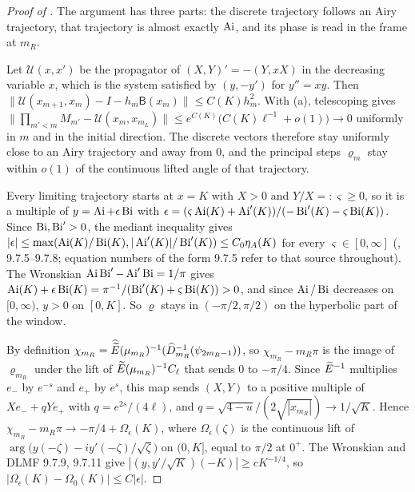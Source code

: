 \begin{proof}[Proof of ]
The argument has three parts: the discrete trajectory follows an Airy trajectory, that
trajectory is almost exactly $\operatorname{Ai}$, and its phase is read in the frame at $m_R$.

 Let $\mathcal U(x,x')$ be the propagator of $(X,Y)'=-(Y,xX)$ in the
decreasing variable $x$, which is the system satisfied by $(y,-y')$ for $y''=xy$. Then
$\|\mathcal U(x_{m+1},x_m)-I-h_m\mathsf B(x_m)\|\le C(K)h_m^2$. With (a),
telescoping gives
$\|\prod_{m'<m}M_{m'}-\mathcal U(x_m,x_{m_L})\|\le e^{C(K)}\bigl(C(K)\ell^{-1}+o(1)\bigr)\to0$
uniformly in $m$ and in the initial direction. The discrete vectors therefore stay
uniformly close to an Airy trajectory and away from $0$, and the principal steps
$\varrho_m$ stay within $o(1)$ of the continuous lifted angle of that trajectory.

 Every limiting trajectory starts at $x=K$ with $X>0$ and
$Y/X=:\varsigma\ge0$, so it is a multiple of $y=\operatorname{Ai}+\epsilon\operatorname{Bi}$ with
$\epsilon=(\varsigma\operatorname{Ai}(K)+\operatorname{Ai}'(K))/(-\operatorname{Bi}'(K)-\varsigma\operatorname{Bi}(K))$. Since $\operatorname{Bi},\operatorname{Bi}'>0$, the mediant
inequality gives $|\epsilon|\le\max(\operatorname{Ai}(K)/\operatorname{Bi}(K),|\operatorname{Ai}'(K)|/\operatorname{Bi}'(K))\le C_0\eta_A(K)$ for
every $\varsigma\in[0,\infty]$ (\cite{DLMF}, 9.7.5--9.7.8; equation numbers of the form 9.7.5
refer to that source throughout). The Wronskian $\operatorname{Ai}\operatorname{Bi}'-\operatorname{Ai}'\operatorname{Bi}=1/\pi$ gives
$\operatorname{Ai}(K)+\epsilon\operatorname{Bi}(K)=\pi^{-1}/(\operatorname{Bi}'(K)+\varsigma\operatorname{Bi}(K))>0$, and since $\operatorname{Ai}/\operatorname{Bi}$ decreases on
$[0,\infty)$, $y>0$ on $[0,K]$. So $\varrho$ stays in $(-\pi/2,\pi/2)$ on the hyperbolic part
of the window.

 By definition $\chi_{m_R}=\widehat{\widetilde E}(\mu_{m_R})^{-1}(\widehat D_{m_R}^{-1}(\psi_{2m_R-1}))$,
so $\chi_{m_R}-m_R\pi$ is the image of $\varrho_{m_R}$ under the lift of $\widetilde E(\mu_{m_R})^{-1}C_\ell$
that sends $0$ to $-\pi/4$. Since $\widetilde E^{-1}$ multiplies $e_-$ by $e^{-s}$ and $e_+$ by $e^{s}$,
this map sends $(X,Y)$ to a positive multiple of $Xe_-+qYe_+$ with $q=e^{2s}/(4\ell)$, and
$q=\sqrt{4-u}/(2\sqrt{|x_{m_R}|})\to1/\sqrt K$. Hence
$\chi_{m_R}-m_R\pi\to-\pi/4+\Omega_\epsilon(K)$, where $\Omega_\epsilon(\zeta)$ is the
continuous lift of $\arg\bigl(y(-\zeta)-iy'(-\zeta)/\sqrt\zeta\bigr)$ on $(0,K]$, equal to
$\pi/2$ at $0^+$. The Wronskian and DLMF 9.7.9, 9.7.11 give
$|(y,y'/\sqrt K)(-K)|\ge cK^{-1/4}$, so $|\Omega_\epsilon(K)-\Omega_0(K)|\le C|\epsilon|$.
\end{proof}

